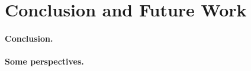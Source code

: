 \section{Conclusion and Future Work}
\label{sect-conclusion}
\paragraph{Conclusion.}

\paragraph{Some perspectives.}


